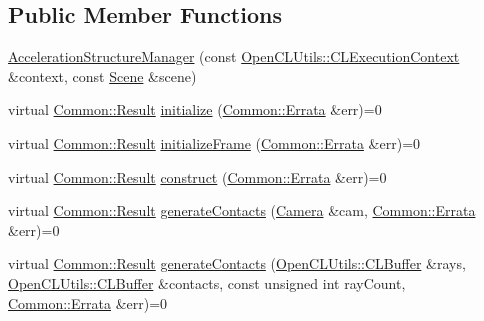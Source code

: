 \subsection*{Public Member Functions}
\begin{DoxyCompactItemize}
\item 
\hyperlink{class_c_l_ray_tracer_1_1_acceleration_structures_1_1_acceleration_structure_manager_a50ed7c8983555244b1c70728404156c0}{Acceleration\+Structure\+Manager} (const \hyperlink{class_c_l_ray_tracer_1_1_open_c_l_utils_1_1_c_l_execution_context}{Open\+C\+L\+Utils\+::\+C\+L\+Execution\+Context} \&context, const \hyperlink{class_c_l_ray_tracer_1_1_scene}{Scene} \&scene)
\item 
virtual \hyperlink{_errata_8h_a389396702f1aff6e71eb21328b0775c1}{Common\+::\+Result} \hyperlink{class_c_l_ray_tracer_1_1_acceleration_structures_1_1_acceleration_structure_manager_a14a5bacd261ea5c3e541ae531a128e4d}{initialize} (\hyperlink{class_c_l_ray_tracer_1_1_common_1_1_errata}{Common\+::\+Errata} \&err)=0
\item 
virtual \hyperlink{_errata_8h_a389396702f1aff6e71eb21328b0775c1}{Common\+::\+Result} \hyperlink{class_c_l_ray_tracer_1_1_acceleration_structures_1_1_acceleration_structure_manager_a3707d7588ce68855e6f086022025f1ea}{initialize\+Frame} (\hyperlink{class_c_l_ray_tracer_1_1_common_1_1_errata}{Common\+::\+Errata} \&err)=0
\item 
virtual \hyperlink{_errata_8h_a389396702f1aff6e71eb21328b0775c1}{Common\+::\+Result} \hyperlink{class_c_l_ray_tracer_1_1_acceleration_structures_1_1_acceleration_structure_manager_a29e770ee9fa4febf24f55ecf202d352b}{construct} (\hyperlink{class_c_l_ray_tracer_1_1_common_1_1_errata}{Common\+::\+Errata} \&err)=0
\item 
virtual \hyperlink{_errata_8h_a389396702f1aff6e71eb21328b0775c1}{Common\+::\+Result} \hyperlink{class_c_l_ray_tracer_1_1_acceleration_structures_1_1_acceleration_structure_manager_ab94dc605d1cee5c93de253bce69f21ca}{generate\+Contacts} (\hyperlink{struct_camera}{Camera} \&cam, \hyperlink{class_c_l_ray_tracer_1_1_common_1_1_errata}{Common\+::\+Errata} \&err)=0
\item 
virtual \hyperlink{_errata_8h_a389396702f1aff6e71eb21328b0775c1}{Common\+::\+Result} \hyperlink{class_c_l_ray_tracer_1_1_acceleration_structures_1_1_acceleration_structure_manager_aaa7b1d615a20126278ef27f0a5f3215c}{generate\+Contacts} (\hyperlink{class_c_l_ray_tracer_1_1_open_c_l_utils_1_1_c_l_buffer}{Open\+C\+L\+Utils\+::\+C\+L\+Buffer} \&rays, \hyperlink{class_c_l_ray_tracer_1_1_open_c_l_utils_1_1_c_l_buffer}{Open\+C\+L\+Utils\+::\+C\+L\+Buffer} \&contacts, const unsigned int ray\+Count, \hyperlink{class_c_l_ray_tracer_1_1_common_1_1_errata}{Common\+::\+Errata} \&err)=0

\end{DoxyCompactItemize}
